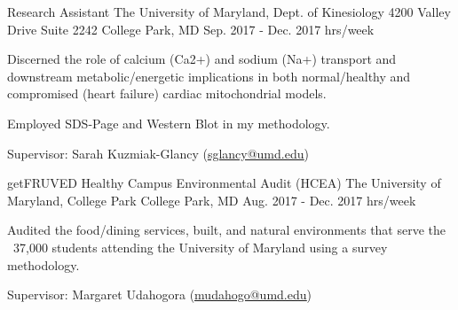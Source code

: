 \begin{cventries}
  \cventry
    {Research Assistant} %
    {The University of Maryland, Dept. of Kinesiology} %
    {4200 Valley Drive \newline Suite 2242 \newline College Park, MD} %
    {Sep. 2017 - Dec. 2017  hrs/week} %
    {
      \begin{cvitems} %
        \item {Discerned the role of calcium (Ca2+) and sodium (Na+) transport and downstream metabolic/energetic implications in both normal/healthy and compromised (heart failure) cardiac mitochondrial models.}
        \item{Employed SDS-Page and Western Blot in my methodology.}
        \item{Supervisor: Sarah Kuzmiak-Glancy (\textcolor{navyblue}{
        {\underline{\href{mailto:sglancy@umd.edu}{sglancy@umd.edu}}}})}
      \end{cvitems}
    }


  \cventry
    {getFRUVED Healthy Campus Environmental Audit (HCEA) } %
    {The University of Maryland, College Park} %
    {College Park, MD} %
    {Aug. 2017 - Dec. 2017  hrs/week} %
    {
      \begin{cvitems} %
        \item {Audited the food/dining services, built, and natural environments that serve the ~37,000 students attending the University of Maryland using a survey methodology.}
        \item{Supervisor: Margaret Udahogora (\textcolor{navyblue}{
        {\underline{\href{mailto:mudahogo@umd.edu}{mudahogo@umd.edu}}}})}
      \end{cvitems}
    }


\end{cventries}
